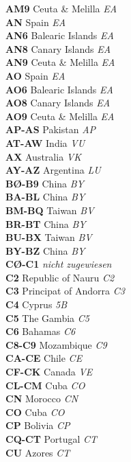\documentclass[landscape,a4paper]{article}
\begin{document}
\begin{multicols}{7}
\textbf{AM9} Ceuta \& Melilla \emph{EA} \\
\textbf{AN} Spain \emph{EA} \\
\textbf{AN6} Balearic Islands \emph{EA} \\
\textbf{AN8} Canary Islands \emph{EA} \\
\textbf{AN9} Ceuta \& Melilla \emph{EA} \\
\textbf{AO} Spain \emph{EA} \\
\textbf{AO6} Balearic Islands \emph{EA} \\
\textbf{AO8} Canary Islands \emph{EA} \\
\textbf{AO9} Ceuta \& Melilla \emph{EA} \\
\textbf{AP-AS} Pakistan \emph{AP} \\
\textbf{AT-AW} India \emph{VU} \\
\textbf{AX} Australia \emph{VK} \\
\textbf{AY-AZ} Argentina \emph{LU} \\
\textbf{BØ-B9} China \emph{BY} \\
\textbf{BA-BL} China \emph{BY} \\
\textbf{BM-BQ} Taiwan \emph{BV} \\
\textbf{BR-BT} China \emph{BY} \\
\textbf{BU-BX} Taiwan \emph{BV} \\
\textbf{BY-BZ} China \emph{BY} \\
\textbf{CØ-C1} \emph{nicht zugewiesen} \\
\textbf{C2} Republic of Nauru \emph{C2} \\
\textbf{C3} Principat of Andorra \emph{C3} \\
\textbf{C4} Cyprus \emph{5B} \\
\textbf{C5} The Gambia \emph{C5} \\
\textbf{C6} Bahamas \emph{C6} \\
\textbf{C8-C9} Mozambique \emph{C9} \\
\textbf{CA-CE} Chile \emph{CE} \\
\textbf{CF-CK} Canada \emph{VE} \\
\textbf{CL-CM} Cuba \emph{CO} \\
\textbf{CN} Morocco \emph{CN} \\
\textbf{CO} Cuba \emph{CO} \\
\textbf{CP} Bolivia \emph{CP} \\
\textbf{CQ-CT} Portugal \emph{CT} \\
\textbf{CU} Azores \emph{CT} \\

\end{multicols}
\end{document}
